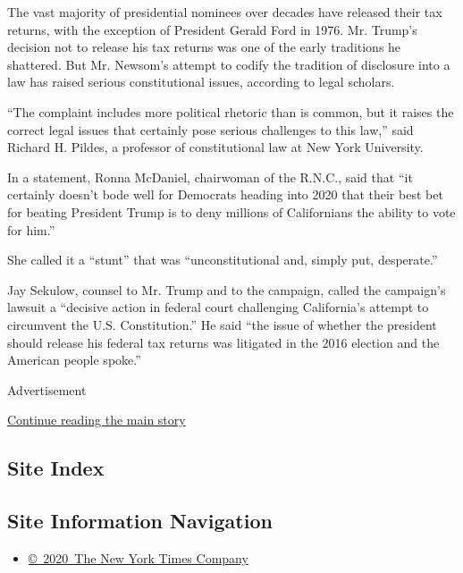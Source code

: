 The vast majority of presidential nominees over decades have released
their tax returns, with the exception of President Gerald Ford in 1976.
Mr. Trump's decision not to release his tax returns was one of the early
traditions he shattered. But Mr. Newsom's attempt to codify the
tradition of disclosure into a law has raised serious constitutional
issues, according to legal scholars.

``The complaint includes more political rhetoric than is common, but it
raises the correct legal issues that certainly pose serious challenges
to this law,'' said Richard H. Pildes, a professor of constitutional law
at New York University.

In a statement, Ronna McDaniel, chairwoman of the R.N.C., said that ``it
certainly doesn't bode well for Democrats heading into 2020 that their
best bet for beating President Trump is to deny millions of Californians
the ability to vote for him.''

She called it a ``stunt'' that was ``unconstitutional and, simply put,
desperate.''

Jay Sekulow, counsel to Mr. Trump and to the campaign, called the
campaign's lawsuit a ``decisive action in federal court challenging
California's attempt to circumvent the U.S. Constitution.'' He said
``the issue of whether the president should release his federal tax
returns was litigated in the 2016 election and the American people
spoke.''

Advertisement

\protect\hyperlink{after-bottom}{Continue reading the main story}

\hypertarget{site-index}{%
\subsection{Site Index}\label{site-index}}

\hypertarget{site-information-navigation}{%
\subsection{Site Information
Navigation}\label{site-information-navigation}}

\begin{itemize}
\tightlist
\item
  \href{https://help.nytimes3xbfgragh.onion/hc/en-us/articles/115014792127-Copyright-notice}{©~2020~The
  New York Times Company}
\end{itemize}

